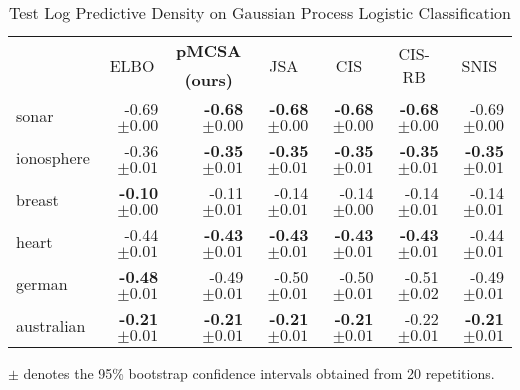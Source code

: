 
\begin{table*}
  \vspace{-0.2in}
  \centering
  \caption{Test Log Predictive Density on Gaussian Process Logistic Classification}\label{table:gp}
  \vspace{-0.05in}
  \setlength{\tabcolsep}{4pt}
  \begin{threeparttable}
  \begin{tabular}{lrrrrrr}
    \toprule
    & \multicolumn{1}{c}{\multirow{2}{*}{ELBO}} & \multicolumn{1}{c}{\multirow{1}{*}{\textbf{pMCSA}}} & \multicolumn{1}{c}{\multirow{2}{*}{JSA}} & \multicolumn{1}{c}{\multirow{2}{*}{CIS}} & \multicolumn{1}{c}{\multirow{2}{*}{CIS-RB}} & \multicolumn{1}{c}{\multirow{2}{*}{SNIS}} \\
    & & \multicolumn{1}{c}{\textbf{(ours)}} & & & & \\
    \midrule
    sonar & {-0.69 {\scriptsize{\(\pm 0.00\)}}} & {\bf-0.68 {\scriptsize{\(\pm 0.00\)}}} & {\bf-0.68 {\scriptsize{\(\pm 0.00\)}}} & {\bf-0.68 {\scriptsize{\(\pm 0.00\)}}} & {\bf-0.68 {\scriptsize{\(\pm 0.00\)}}} & {-0.69 {\scriptsize{\(\pm 0.00\)}}} \\
    ionosphere & {-0.36 {\scriptsize{\(\pm 0.01\)}}} & {\bf-0.35 {\scriptsize{\(\pm 0.01\)}}} & {\bf-0.35 {\scriptsize{\(\pm 0.01\)}}} & {\bf-0.35 {\scriptsize{\(\pm 0.01\)}}} & {\bf-0.35 {\scriptsize{\(\pm 0.01\)}}} & {\bf-0.35 {\scriptsize{\(\pm 0.01\)}}} \\
    breast & {\bf-0.10 {\scriptsize{\(\pm 0.00\)}}} & {-0.11 {\scriptsize{\(\pm 0.01\)}}} & {-0.14 {\scriptsize{\(\pm 0.01\)}}} & {-0.14 {\scriptsize{\(\pm 0.00\)}}} & {-0.14 {\scriptsize{\(\pm 0.01\)}}} & {-0.14 {\scriptsize{\(\pm 0.01\)}}} \\
    heart & {-0.44 {\scriptsize{\(\pm 0.01\)}}} & {\bf-0.43 {\scriptsize{\(\pm 0.01\)}}} & {\bf-0.43 {\scriptsize{\(\pm 0.01\)}}} & {\bf-0.43 {\scriptsize{\(\pm 0.01\)}}} & {\bf-0.43 {\scriptsize{\(\pm 0.01\)}}} & {-0.44 {\scriptsize{\(\pm 0.01\)}}} \\
    german & {\bf-0.48 {\scriptsize{\(\pm 0.01\)}}} & {-0.49 {\scriptsize{\(\pm 0.01\)}}} & {-0.50 {\scriptsize{\(\pm 0.01\)}}} & {-0.50 {\scriptsize{\(\pm 0.01\)}}} & {-0.51 {\scriptsize{\(\pm 0.02\)}}} & {-0.49 {\scriptsize{\(\pm 0.01\)}}} \\
    australian & {\bf-0.21 {\scriptsize{\(\pm 0.01\)}}} & {\bf-0.21 {\scriptsize{\(\pm 0.01\)}}} & {\bf-0.21 {\scriptsize{\(\pm 0.01\)}}} & {\bf-0.21 {\scriptsize{\(\pm 0.01\)}}} & {-0.22 {\scriptsize{\(\pm 0.01\)}}} & {\bf-0.21 {\scriptsize{\(\pm 0.01\)}}} \\\bottomrule
  \end{tabular}
  \begin{tablenotes}
    \item[]{\footnotesize \(\pm\) denotes the 95\% bootstrap confidence intervals obtained from 20 repetitions.}
  \end{tablenotes}
  \end{threeparttable}
  \vspace{-0.15in}
\end{table*}

